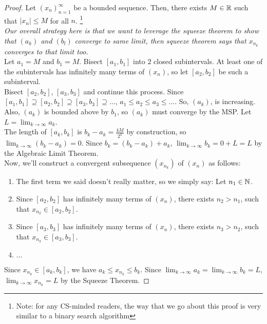 \begin{proof}
Let $(x_n)^\infty_{n=1}$ be a bounded sequence. Then, there exists $M\in \mathbb{R}$ such that $|x_n| \leq M$ for all $n$. \footnote{Note: for any CS-minded readers, the way that we go about this proof is very similar to a binary search algorithm}\\

\emph{Our overall strategy here is that we want to leverage the squeeze theorem to show that $(a_k)$ and $(b_l)$ converge to same limit, then squeeze theorem says that $x_{n_k}$ converges to that limit too.} \\

Let $a_1 = M$ and $b_1 = M$. Bisect $[a_1, b_1]$ into $2$ closed subintervals. At least one of the subintervals has infinitely many terms of $(x_n)$, so let $[a_2, b_2]$ be such a subinterval. \\

Bisect $[a_2, b_2]$, $[a_3, b_3]$ and continue this process. Since $[a_1, b_1] \supseteq [a_2, b_2] \supseteq [a_3, b_3] \supseteq \dots$, $a_1 \le a_2 \le a_3 \le \dots$. So, $(a_k)$, is increasing. Also, $(a_k)$ is bounded above by $b_1$, so $(a_k)$ must converge by the MSP. Let $L = \lim_{k\to\infty}a_k$. \\

The length of $[a_k, b_k]$ is $b_k - a_k = \frac{4M}{2^k}$ by construction, so $\lim_{k\to\infty}(b_k-a_k) = 0$.  Since $b_k = (b_k -a_k) + a_k$, $\lim_{k\to\infty}b_k = 0 + L = L$ by the Algebraic Limit Theorem.\\

Now, we'll construct a convergent subsequence $(x_{n_k})$ of $(x_n)$ as follows:
\begin{enumerate}
    \item The first term we said doesn't really matter, so we simply say: Let $n_1 \in \mathbb{N}$.
    \item Since $[a_2, b_2]$ has infinitely many terms of $(x_n)$, there exists $n_2 > n_1$, such that $x_{n_2} \in [a_2, b_2]$.
    \item  Since $[a_3, b_3]$ has infinitely many terms of $(x_n)$, there exists $n_3 > n_2$, such that $x_{n_3} \in [a_3, b_3]$.
    \item $\dots$
\end{enumerate}
Since $x_{n_k} \in [a_k, b_k]$, we have $a_k \leq x_{n_k} \leq b_k$. Since $\lim_{k\to\infty} a_k = \lim_{k\to\infty}b_k = L$, $\lim_{k\to\infty}x_{n_k} = L$ by the Squeeze Theorem.
\end{proof}


